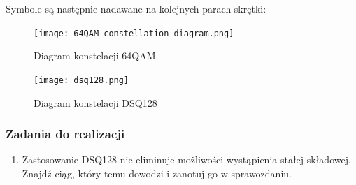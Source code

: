 Symbole są następnie nadawane na kolejnych parach skrętki:
\begin{table}[h]
    \centering
\end{table}

\begin{figure}[h]
    \centering
    \texttt{[image: 64QAM-constellation-diagram.png]}
    \caption{Diagram konstelacji 64QAM}
    \label{fig:lab-64QAM}
\end{figure}

\begin{figure}[h]
    \centering
    \texttt{[image: dsq128.png]}
    \caption{Diagram konstelacji DSQ128}
    \label{fig:lab-dsq128}
\end{figure}

\subsubsection{Zadania do realizacji}

\begin{enumerate}
    \item Zastosowanie DSQ128 nie eliminuje możliwości wystąpienia stałej składowej. Znajdź ciąg, który
    temu dowodzi i zanotuj go w sprawozdaniu.
\end{enumerate}
